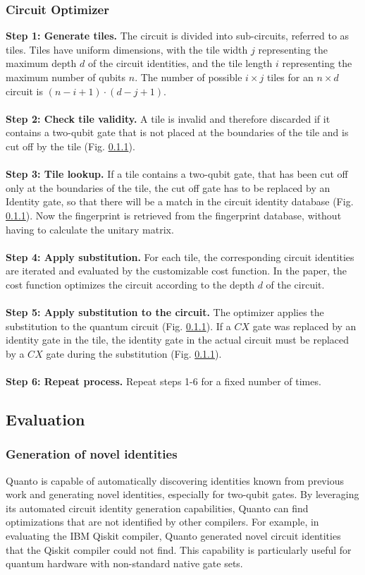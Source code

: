 \subsubsection{Circuit Optimizer}
\textbf{Step 1: Generate tiles.}
The circuit is divided into sub-circuits, referred to as tiles. Tiles have uniform dimensions, with the tile width $j$ representing the maximum depth $d$ of the circuit identities, and the tile length $i$ representing the maximum number of qubits $n$. The number of possible $i \times j$ tiles for an $n \times d$ circuit is $(n-i+1) \cdot (d-j+1)$.
\\\\
\textbf{Step 2: Check tile validity.}
A tile is invalid and therefore discarded if it contains a two-qubit gate that is not placed at the boundaries of the tile and is cut off by the tile (Fig. \ref{}).
\\\\
\textbf{Step 3: Tile lookup.}
If a tile contains a two-qubit gate, that has been cut off only at the boundaries of the tile, the cut off gate has to be replaced by an Identity gate, so that there will be a match in the circuit identity database (Fig. \ref{}). Now the fingerprint is retrieved from the fingerprint database, without having to calculate the unitary matrix. 
\\\\
\textbf{Step 4: Apply substitution.}
For each tile, the corresponding circuit identities are iterated and evaluated by the customizable cost function. In the paper, the cost function optimizes the circuit according to the depth $d$ of the circuit. 
\\\\
\textbf{Step 5: Apply substitution to the circuit.}
The optimizer applies the substitution to the quantum circuit (Fig. \ref{}). If a $CX$ gate was replaced by an identity gate in the tile, the identity gate in the actual circuit must be replaced by a $CX$ gate during the substitution (Fig. \ref{}). 
\\\\
\textbf{Step 6: Repeat process.}
Repeat steps 1-6 for a fixed number of times.

\subsection{Evaluation}
\subsubsection{Generation of novel identities}
Quanto is capable of automatically discovering identities known from previous work and generating novel identities, especially for two-qubit gates. By leveraging its automated circuit identity generation capabilities, Quanto can find optimizations that are not identified by other compilers. For example, in evaluating the IBM Qiskit compiler, Quanto generated novel circuit identities that the Qiskit compiler could not find. This capability is particularly useful for quantum hardware with non-standard native gate sets.
